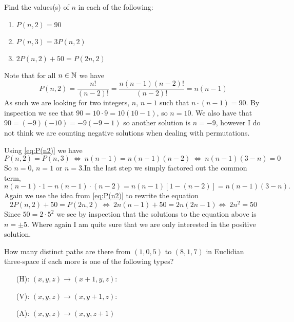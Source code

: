 \documentclass[a4paper, english, 12pt]{article} %
\begin{document}
\begin{problem}
  Find the values(s) of $n$ in each of the following:
  \begin{enumerate}[label = (\alph*)]
    \item $P(n, 2) = 90$
    \item $P(n, 3) = 3 P(n, 2)$
    \item $2 P(n, 2) + 50 = P(2n, 2)$
  \end{enumerate}
\end{problem}

\begin{answer}
  Note that for all $n \in \mathbb{N}$ we have
  \begin{equation}
    \label{eq:P(n2)}
    P(n, 2) = \frac{n!}{(n - 2)!} = \frac{n(n-1)(n-2)!}{(n-2)!} = n(n-1)
  \end{equation}
  As such we are looking for two integers, $n$, $n-1$ such that $n \cdot (n-1) =
  90$. By inspection we see that $90 = 10 \cdot 9 = 10 (10 - 1)$, so $n=10$. We
  also have that $90 = (-9)(-10) = -9(-9-1)$ so another solution is $n=-9$,
  however I do not think we are counting negative solutions when dealing with
  permutations.

  Using \cref{eq:P(n2)} we have
  \begin{equation*}
    P(n, 2) = P(n, 3) \ \Leftrightarrow \ n(n-1) = n(n-1)(n-2)
                      \ \Leftrightarrow \ n(n-1)(3 - n) = 0
  \end{equation*}
  So $n = 0$, $n = 1$ or $n = 3$.In the last step we simply factored out the
  common term,
  \begin{equation*}
    n(n - 1) \cdot 1 - n(n-1) \cdot (n-2) = n(n-1) [1 - (n-2)] = n(n-1)(3 - n).
  \end{equation*}
  Again we use the idea from \cref{eq:P(n2)} to rewrite the equation
  \begin{equation*}
    2P(n, 2) + 50 = P(2n, 2) \ \Leftrightarrow \ 2 n(n-1) + 50 = 2n(2n-1)
                               \Leftrightarrow \ 2 n^2 = 50
  \end{equation*}
  Since $ 50 = 2 \cdot 5^2$ we see by inspection that the solutions to the
  equation above is $n = \pm 5$. Where again I am quite sure that we are only
  interested in the positive solution.
\end{answer}

\begin{problem}[27]
  \begin{subproblem}[2]
    \label{subproblem:27b}
    How many distinct paths are there from $(1, 0, 5)$ to $(8, 1, 7)$ in
    Euclidian three-space if each more is one of the following types?
    \begin{enumerate}
        \item[(H):] $(x, y, z) \to (x + 1, y, z)$:
        \item[(V):] $(x, y, z) \to (x, y + 1, z)$:
        \item[(A):] $(x, y, z) \to (x, y, z + 1)$
    \end{enumerate} 
  \end{subproblem}
\end{problem}
\end{document}
